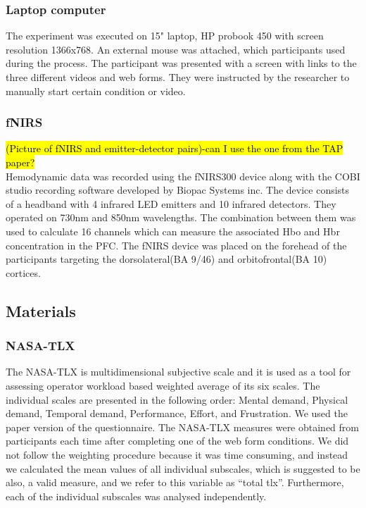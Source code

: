 \documentclass[a4paper]{report}
\begin{document}
			\subsubsection{Laptop computer}
			The experiment was executed on 15" laptop, HP probook 450 with screen resolution 1366x768. An external mouse was attached, which participants used during the process. The participant was presented with a screen with links to the three different videos and web forms. They were instructed by the researcher to manually start certain condition or video. 
			\subsubsection{fNIRS}
			\hl{(Picture of fNIRS and emitter-detector pairs)-can I use the one from the TAP paper?}\\
			Hemodynamic data was recorded using the fNIRS300 device along with the COBI studio recording software developed by Biopac Systems inc. The device consists of a headband with 4 infrared LED emitters and 10 infrared detectors. They operated on 730nm and 850nm wavelengths. The combination between them was used to calculate 16 channels which can measure the associated Hbo and Hbr concentration in the PFC. The fNIRS device was placed on the forehead of the participants targeting the dorsolateral(BA 9/46) and orbitofrontal(BA 10) cortices.
			
        \subsection{Materials}
			\subsubsection{NASA-TLX}
			The NASA-TLX\cite{nasatlx} is multidimensional subjective scale and it is used as a tool for assessing operator workload based weighted average of its six scales. The individual scales are presented in the following order: Mental demand, Physical demand, Temporal demand, Performance, Effort, and Frustration. We used the paper version of the questionnaire. The NASA-TLX measures were obtained from participants each time after completing one of the web form conditions. We did not follow the weighting procedure because it was time consuming, and instead we calculated the mean values of all individual subscales, which is suggested to be also, a valid measure\cite{hart2006nasa}, and we refer to this variable as ``total tlx''. Furthermore, each of the individual subscales was analysed independently.
\end{document}
